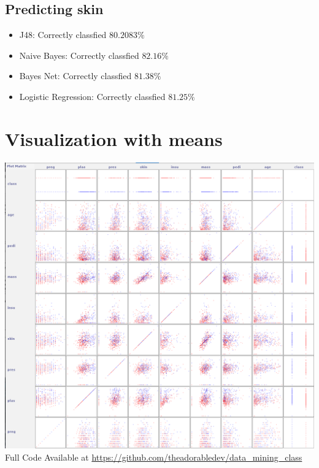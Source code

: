 \documentclass{article}
\begin{document}
\subsection{\small{Predicting skin }}
\begin{itemize}
\item J48: Correctly classfied $80.2083 \%$
\item Naive Bayes: Correctly classfied $82.16 \%$
\item Bayes Net: Correctly classfied $81.38 \%$
\item Logistic Regression: Correctly classfied $81.25 \%$
\end{itemize}

\section{\small{Visualization with means}}
\includegraphics[width=\textwidth]{Regressed_diabetes}
Full Code Available at \url{https://github.com/theadorabledev/data_mining_class}
\end{document}
